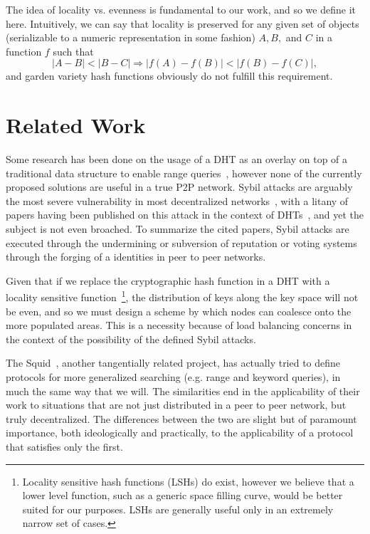 \documentclass[10pt]{IEEEtran}
\begin{document}
The idea of locality vs. evenness is fundamental to our work, and so we define it here. Intuitively, we can say that locality is preserved for any given set of objects (serializable to a numeric representation in some fashion) $A,B,$ and $C$ in a function $f$ such that
\begin{equation} \label{eq:locality}
|A-B| < |B-C| \Rightarrow |f(A)-f(B)| < |f(B) - f(C)|,
\end{equation}
and garden variety hash functions obviously do not fulfill this requirement.

\section{Related Work}
\par Some research has been done on the usage of a DHT as an overlay on top of a traditional data structure to enable range queries~\cite{Ramabhadran:2004tr,Desnoyers:2008uo}, however none of the currently proposed solutions are useful in a true P2P network. Sybil attacks are arguably the most severe vulnerability in most decentralized networks~\cite{Douceur:2002jr}, with a litany of papers having been published on this attack in the context of DHTs~\cite{LesniewskiLass:2010ue}, and yet the subject is not even broached. To summarize the cited papers, Sybil attacks are executed through the undermining or subversion of reputation or voting systems through the forging of a identities in peer to peer networks.

\par Given that if we replace the cryptographic hash function in a DHT with a locality sensitive function~\footnote{Locality sensitive hash functions (LSHs) do exist, however we believe that a lower level function, such as a generic space filling curve, would be better suited for our purposes. LSHs are generally useful only in an extremely narrow set of cases.}, the distribution of keys along the key space will not be even, and so we must design a scheme by which nodes can coalesce onto the more populated areas. This is a necessity because of load balancing concerns in the context of the possibility of the defined Sybil attacks.

\par The Squid~\cite{Schmidt:2003cd}, another tangentially related project, has actually tried to define protocols for more generalized searching (e.g. range and keyword queries), in much the same way that we will. The similarities end in the applicability of their work to situations that are not just distributed in a peer to peer network, but truly decentralized. The differences between the two are slight but of paramount importance, both ideologically and practically, to the applicability of a protocol that satisfies only the first.
\end{document}
